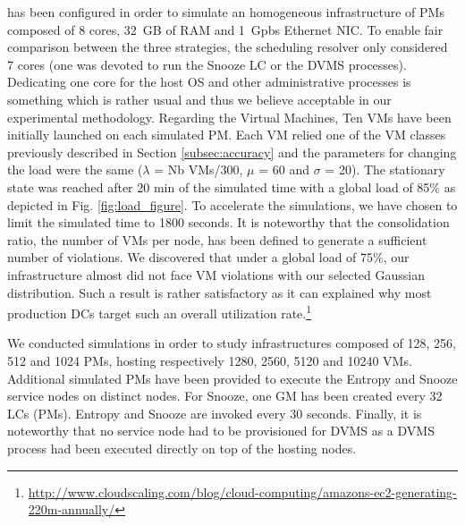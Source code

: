\vmps has been configured in order to simulate an homogeneous
infrastructure of PMs composed of 8 cores, 32~GB of RAM and 1~Gpbs
Ethernet NIC. To enable fair comparison between the three strategies,
the scheduling resolver only considered 7 cores (\ie one was devoted
to run the Snooze LC or the DVMS processes). Dedicating one core for
the host OS and other administrative processes is something which is
rather usual and thus we believe acceptable in our experimental
methodology. Regarding the Virtual Machines, Ten VMs have been
initially launched on each simulated PM. Each VM relied one of the VM
classes previously described in Section \ref{subsec:accuracy} and the
parameters for changing the load were the same ($\lambda$ = Nb
VMs/300, $\mu$ = 60 and $\sigma$ = 20). The stationary state was
reached after 20 min of the simulated time with a global load of 85\%
as depicted in Fig. \ref{fig:load_figure}. To accelerate the
simulations, we have chosen to limit the simulated time to 1800
seconds. It is noteworthy that the consolidation ratio, \ie the number
of VMs per node, has been defined to generate a sufficient number of
violations. We discovered that under a global load of 75\%, our
infrastructure almost did not face VM violations with our selected Gaussian
distribution. Such a result is rather
satisfactory as it can explained why most production DCs target such
an overall utilization rate.\footnote{\url{http://www.cloudscaling.com/blog/cloud-computing/amazons-ec2-generating-220m-annually/}}

We conducted simulations in order to study infrastructures composed of
128, 256, 512 and 1024 PMs, hosting respectively 1280, 2560, 5120 and
10240 VMs. Additional simulated PMs have been provided to execute the
Entropy and Snooze service nodes on distinct nodes. For Snooze, one GM
has been created every 32 LCs (\ie PMs). Entropy and Snooze are
invoked every 30 seconds. Finally, it is noteworthy that no service
node had to be provisioned for DVMS as a DVMS process had been
executed directly on top of the hosting nodes.

